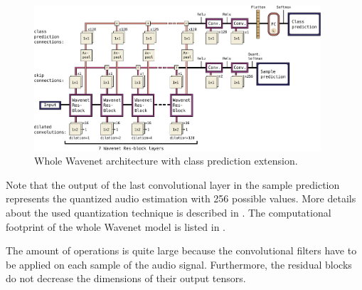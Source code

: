 \begin{figure}[!ht]
  \centering
    \includegraphics[width=0.95\textwidth]{./4_nn/figs/nn_arch_wavenet_all.pdf}
  \caption{Whole Wavenet architecture with class prediction extension.}
  \label{fig:nn_arch_wavenet_all}
\end{figure}
\FloatBarrier
\noindent
Note that the output of the last convolutional layer in the sample prediction represents the quantized audio estimation with 256 possible values.
More details about the used quantization technique is described in \cite{Oord2016}.
The computational footprint of the whole Wavenet model is listed in .

The amount of operations is quite large because the convolutional filters have to be applied on each sample of the audio signal.
Furthermore, the residual blocks do not decrease the dimensions of their output tensors.